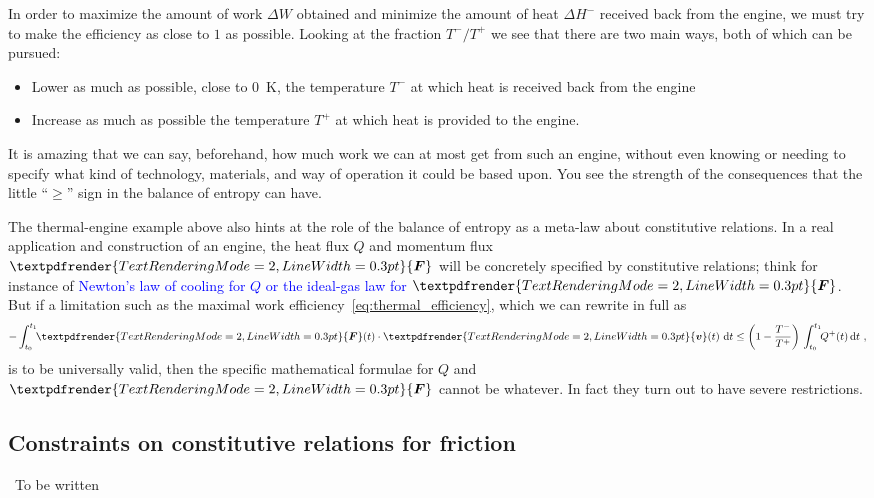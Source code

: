 \documentclass[a4paper,12pt,%
onecolumn,oneside,%
british%
]{memoir}
\renewcommand*{\bm}[1]{\textpdfrender{TextRenderingMode=2,LineWidth=0.3pt}{\boldsymbol{#1}}}
\newcommand{\mynotew}[1]{{\footnotesize\color{midgrey}\faIcon{tools}\ #1}}
\newcommand*{\di}{\mathrm{d}}%
\newcommand*{\incr}{\Delta}%
\renewcommand*{\|}[1][]{\nonscript\:#1\vert\nonscript\:\mathopen{}}
\newcommand*{\sect}{\S}%
\renewcommand*{\autoref}[2]{\sidepar{\vspace{-1ex}\footnotesize{\color{blue}\faIcon{%
angle-right%
}\enspace\sect\,\ref{#1} page\,\pageref{#1}}}\textcolor{blue}{#2}}
\newcommand*{\yv}{\bm{v}}
\newcommand*{\yti}{t_{0}}
\newcommand*{\ytf}{t_{1}}
\newcommand*{\yQ}{Q}%
\newcommand*{\yQp}{Q^{+}}%
\newcommand*{\yhem}{\incr H^{-}}%
\newcommand*{\yW}{\incr W}%
\newcommand*{\yF}{\bm{F}}
\newcommand*{\yT}{T}%
\newcommand*{\yTp}{\yT^{+}}%
\newcommand*{\yTm}{\yT^{-}}%
\begin{document}
In order to maximize the amount of work $\yW$ obtained and minimize the amount of heat $\yhem$ received back from the engine, we must try to make the efficiency as close to $1$ as possible. Looking at the fraction $\yTm/\yTp$ we see that there are two main ways, both of which can be pursued:
\begin{itemize}
\item Lower as much as possible, close to \qty{0}{K}, the temperature $\yTm$ at which heat is received back from the engine
\item Increase as much as possible the temperature $\yTp$ at which heat is provided to the engine.
\end{itemize}

\medskip

It is amazing that we can say, beforehand, how much work we can at most get from such an engine, without even knowing or needing to specify what kind of technology, materials, and way of operation it could be based upon. You see the strength of the consequences that the little \enquote{$\ge$} sign in the balance of entropy can have.

The thermal-engine example above also hints at the role of the balance of entropy as a meta-law about constitutive relations. In a real application and construction of an engine, the heat flux $\yQ$ and momentum flux $\yF$ will be concretely specified by constitutive relations; think for instance of \autoref{sec:int_energy_idealgas}{Newton's law of cooling for $\yQ$ or the ideal-gas law for $\yF$}. But if a limitation such as the maximal work efficiency~\eqref{eq:thermal_efficiency}, which we can rewrite in full as
\begin{equation*}
  -\int_{\yti}^{\ytf}\!\!\yF(t)\cdot\yv(t)\ \di t
  \le
  \biggl(1-\frac{\yTm}{\yTp}\biggr)\,
  \int_{\yti}^{\ytf}\!\!\yQp(t)\,\di t \ ,
\end{equation*}
is to be universally valid, then the specific mathematical formulae for $\yQ$ and $\yF$ cannot be whatever. In fact they turn out to have severe restrictions.


\subsection{Constraints on constitutive relations for friction}
\label{sec:friction_entropy}
\mynotew{To be written}



\end{document}
